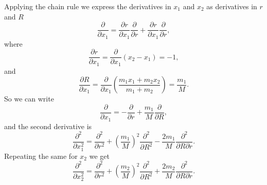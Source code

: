 \documentclass[../Main/chem331-notes.tex]{subfiles}
\begin{document}
Applying the chain rule we express the derivatives in $x_1$ and $x_2$ as derivatives in $r$ and $R$
\begin{equation}
\frac{\partial}{\partial x_1} = \frac{\partial r}{\partial x_1} \frac{\partial}{\partial r} + \frac{\partial r}{\partial x_1} \frac{\partial}{\partial r},
\end{equation}
where
\begin{equation}
\frac{\partial r}{\partial x_1} = \frac{\partial}{\partial x_1} \left( x_2 - x_1 \right) = -1,
\end{equation}
and
\begin{equation}
\frac{\partial R}{\partial x_1} = \frac{\partial}{\partial x_1} \left(\frac{m_1 x_1 + m_2 x_2}{m_1 + m_2} \right) = \frac{m_1}{M}.
\end{equation}
So we can write
\begin{equation}
\frac{\partial}{\partial x_1} = - \frac{\partial}{\partial r} + \frac{m_1}{M}\frac{\partial}{\partial R},
\end{equation}
and the second derivative is
\begin{equation}
\frac{\partial^2}{\partial x^2_1} = \frac{\partial^2}{\partial r^2} + \left(\frac{m_1}{M}\right)^2\frac{\partial^2}{\partial R^2} - \frac{2 m_1}{M}\frac{\partial^2}{\partial R \partial r}.
\end{equation}
Repeating the same for $x_2$ we get
\begin{equation}
\frac{\partial^2}{\partial x^2_2} = \frac{\partial^2}{\partial r^2} + \left(\frac{m_2}{M}\right)^2\frac{\partial^2}{\partial R^2} + \frac{2 m_2}{M}\frac{\partial^2}{\partial R \partial r}.
\end{equation}
\end{document}
